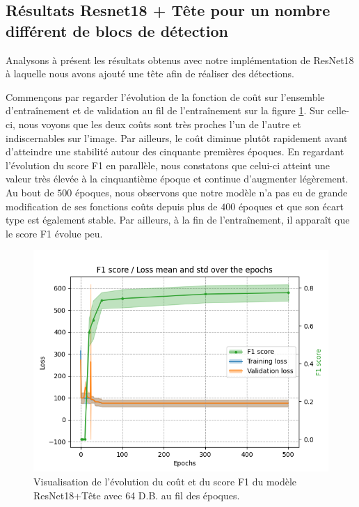 \subsection{Résultats Resnet18 + Tête pour un nombre différent de blocs de détection}

Analysons à présent les résultats obtenus avec notre implémentation de ResNet18 à laquelle nous avons ajouté une tête afin de réaliser des détections. 

Commençons par regarder l'évolution de la fonction de coût sur l'ensemble d'entraînement et de validation au fil de l'entraînement sur la figure \ref{fig:resnet18+head_loss}. Sur celle-ci, nous voyons que les deux coûts sont très proches l'un de l'autre et indiscernables sur l'image. Par ailleurs, le coût diminue plutôt rapidement avant d'atteindre une stabilité autour des cinquante premières époques. En regardant l'évolution du score F1 en parallèle, nous constatons que celui-ci atteint une valeur très élevée à la cinquantième époque et continue d'augmenter légèrement. Au bout de $500$ époques, nous observons que notre modèle n'a pas eu de grande modification de ses fonctions coûts depuis plus de $400$ époques et que son écart type est également stable. Par ailleurs, à la fin de l'entraînement, il apparaît que le score F1 évolue peu.

\begin{figure}[hbt!]
    \centering
    \includegraphics[scale=0.7]{Figures/results/resnet18+head/r18_loss.png}
    \caption{Visualisation de l'évolution du coût et du score F1 du modèle ResNet18+Tête avec 64 D.B. au fil des époques.}
    \label{fig:resnet18+head_loss}
\end{figure}

